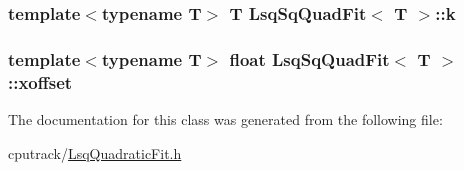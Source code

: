 \subsubsection[{\texorpdfstring{k}{k}}]{\setlength{\rightskip}{0pt plus 5cm}template$<$typename T$>$ T {\bf Lsq\+Sq\+Quad\+Fit}$<$ T $>$\+::k}\hypertarget{class_lsq_sq_quad_fit_a73e23f026e8415f042ba540d2fbe2ab2}{}\label{class_lsq_sq_quad_fit_a73e23f026e8415f042ba540d2fbe2ab2}
\subsubsection[{\texorpdfstring{xoffset}{xoffset}}]{\setlength{\rightskip}{0pt plus 5cm}template$<$typename T$>$ float {\bf Lsq\+Sq\+Quad\+Fit}$<$ T $>$\+::xoffset}\hypertarget{class_lsq_sq_quad_fit_aaa34bae332c501e7d18cca96fb51f403}{}\label{class_lsq_sq_quad_fit_aaa34bae332c501e7d18cca96fb51f403}


The documentation for this class was generated from the following file\+:\begin{DoxyCompactItemize}
\item 
cputrack/\hyperlink{_lsq_quadratic_fit_8h}{Lsq\+Quadratic\+Fit.\+h}\end{DoxyCompactItemize}
